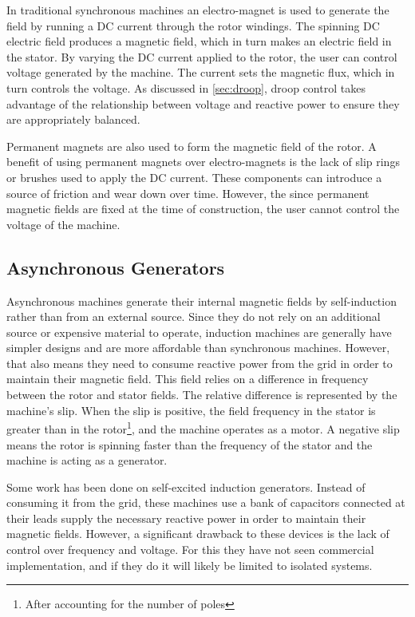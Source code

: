 In traditional synchronous machines an electro-magnet is used to generate the field by running a DC current through the rotor windings. The spinning DC electric field produces a magnetic field, which in turn makes an electric field in the stator. By varying the DC current applied to the rotor, the user can control voltage generated by the machine. The current sets the magnetic flux, which in turn controls the voltage. \cite{Chapman2005} As discussed in \autoref{sec:droop}, droop control takes advantage of the relationship between voltage and reactive power to ensure they are appropriately balanced.

Permanent magnets are also used to form the magnetic field of the rotor. A benefit of using permanent magnets over electro-magnets is the lack of slip rings or brushes used to apply the DC current. These components can introduce a source of friction and wear down over time. However, the since permanent magnetic fields are fixed at the time of construction, the user cannot control the voltage of the machine.

\subsection{Asynchronous Generators}
Asynchronous machines generate their internal magnetic fields by self-induction rather than from an external source. Since they do not rely on an additional source or expensive material to operate, induction machines are generally have simpler designs and are more affordable than synchronous machines. However, that also means they need to consume reactive power from the grid in order to maintain their magnetic field. This field relies on a difference in frequency between the rotor and stator fields. The relative difference is represented by the machine's slip. When the slip is positive, the field frequency in the stator is greater than in the rotor\footnote{After accounting for the number of poles}, and the machine operates as a motor. A negative slip means the rotor is spinning faster than the frequency of the stator and the machine is acting as a generator. 


Some work has been done on self-excited induction generators\cite{Ouazenne1983, Ammasaigounden1986}. Instead of consuming it from the grid, these machines use a bank of capacitors connected at their leads supply the necessary reactive power in order to maintain their magnetic fields. However, a significant drawback to these devices is the lack of control over frequency and voltage.\cite{Bansal2005} For this they have not seen commercial implementation, and if they do it will likely be limited to isolated systems.

